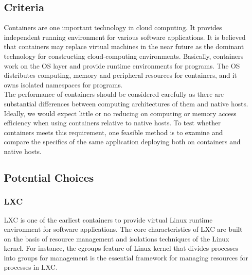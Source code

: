 \documentclass[letterpaper,10pt]{article}
\begin{document}
	\subsection{Criteria}
  Containers are one important technology in cloud computing. It provides independent running environment for various software applications. It is believed that containers may replace virtual machines in the near future as the dominant technology for constructing cloud-computing environments. Basically, containers work on the OS layer and provide runtime environments for programs. The OS distributes computing, memory and peripheral resources for containers, and it owns isolated namespaces for programs.\\
  The performance of containers should be considered carefully as there are substantial differences between computing architectures of them and native hosts. Ideally, we would expect little or no reducing on computing or memory access efficiency when using containers relative to native hosts. To test whether containers meets this requirement, one feasible method is to examine and compare the specifics of the same application deploying both on containers and native hosts.

	\subsection{Potential Choices}
		\subsubsection{LXC}
    LXC is one of the earliest containers to provide virtual Linux runtime environment for software applications. The core characteristics of LXC are built on the basis of resource management and isolations techniques of the Linux kernel. For instance, the cgroups feature of Linux kernel that divides processes into groups for management is the essential framework for managing resources for processes in LXC.
\end{document}
